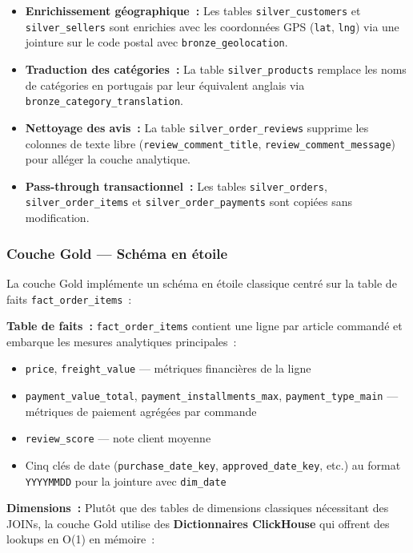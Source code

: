 \begin{itemize}
  \setlength{\itemsep}{0.4em}
  \item \textbf{Enrichissement géographique~:} Les tables \texttt{silver\_customers} et \texttt{silver\_sellers} sont enrichies avec les coordonnées GPS (\texttt{lat}, \texttt{lng}) via une jointure sur le code postal avec \texttt{bronze\_geolocation}.
  \item \textbf{Traduction des catégories~:} La table \texttt{silver\_products} remplace les noms de catégories en portugais par leur équivalent anglais via \texttt{bronze\_category\_translation}.
  \item \textbf{Nettoyage des avis~:} La table \texttt{silver\_order\_reviews} supprime les colonnes de texte libre (\texttt{review\_comment\_title}, \texttt{review\_comment\_message}) pour alléger la couche analytique.
  \item \textbf{Pass-through transactionnel~:} Les tables \texttt{silver\_orders}, \texttt{silver\_order\_items} et \texttt{silver\_order\_payments} sont copiées sans modification.
\end{itemize}

\subsubsection{Couche Gold — Schéma en étoile}

La couche Gold implémente un schéma en étoile classique centré sur la table de faits \texttt{fact\_order\_items}~:

\textbf{Table de faits~:} \texttt{fact\_order\_items} contient une ligne par article commandé et embarque les mesures analytiques principales~:

\begin{itemize}
  \setlength{\itemsep}{0.3em}
  \item \texttt{price}, \texttt{freight\_value} — métriques financières de la ligne
  \item \texttt{payment\_value\_total}, \texttt{payment\_installments\_max}, \texttt{payment\_type\_main} — métriques de paiement agrégées par commande
  \item \texttt{review\_score} — note client moyenne
  \item Cinq clés de date (\texttt{purchase\_date\_key}, \texttt{approved\_date\_key}, etc.) au format \texttt{YYYYMMDD} pour la jointure avec \texttt{dim\_date}
\end{itemize}

\textbf{Dimensions~:} Plutôt que des tables de dimensions classiques nécessitant des JOINs, la couche Gold utilise des \textbf{Dictionnaires ClickHouse} qui offrent des lookups en O(1) en mémoire~:

